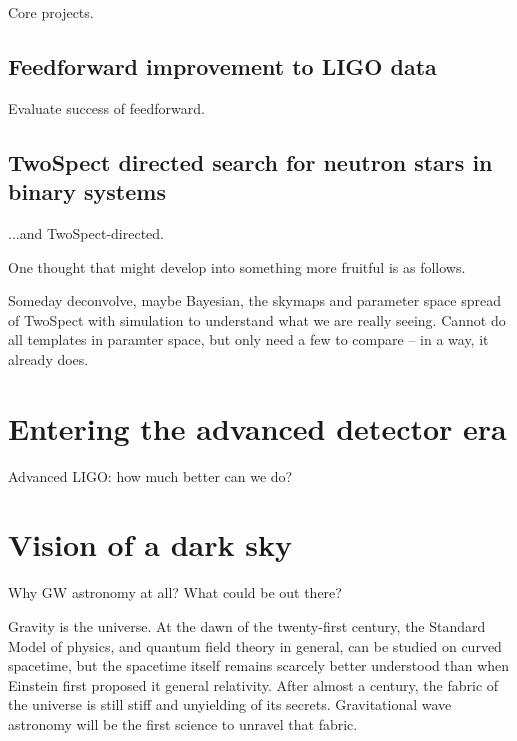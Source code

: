         Core projects.

        \subsection{Feedforward improvement to LIGO data}
        \label{feedforward_end}

            Evaluate success of feedforward.

        \subsection{TwoSpect directed search for neutron stars in binary systems}
        \label{TwoSpect_end}

            ...and TwoSpect-directed.

            One thought that might develop into something more fruitful is as follows.

            Someday deconvolve, maybe Bayesian, the skymaps and parameter space spread of TwoSpect with simulation to understand what we are really seeing. Cannot do all templates in paramter space, but only need a few to compare -- in a way, it already does.

    \section{Entering the advanced detector era}
    \label{advanced_detector_era}

        Advanced LIGO: how much better can we do?

    \section{Vision of a dark sky}
    \label{dark_sky}

        Why GW astronomy at all? What could be out there?

        Gravity is the universe. At the dawn of the twenty-first century, the Standard Model of physics, and quantum field theory in general, can be studied on curved spacetime, but the spacetime itself remains scarcely better understood than when Einstein first proposed it general relativity. After almost a century, the fabric of the universe is still stiff and unyielding of its secrets. Gravitational wave astronomy will be the first science to unravel that fabric. 


